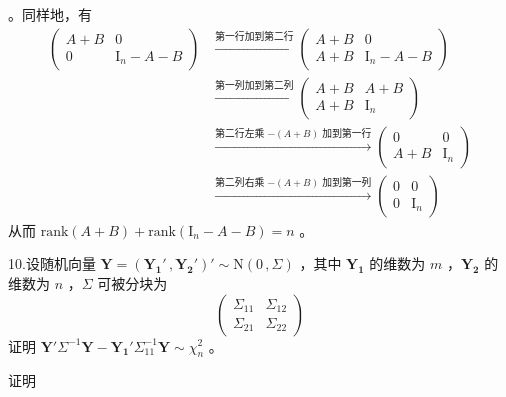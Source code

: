 \documentclass[12pt,hyperref,]{ctexart}
\begin{document}
。同样地，有 \begin{equation*}
\begin{aligned}
\begin{pmatrix}
A+B & 0 \\
0 & \mathrm{I}_n-A-B
\end{pmatrix} & \xrightarrow{\text{第一行加到第二行}} 
\begin{pmatrix}
A+B & 0 \\
A+B & \mathrm{I}_n-A-B
\end{pmatrix} \\
& \xrightarrow{\text{第一列加到第二列}}
\begin{pmatrix}
A+B & A+B \\
A+B & \mathrm{I}_n
\end{pmatrix} \\
& \xrightarrow{\text{第二行左乘 $-(A+B)$ 加到第一行}}
\begin{pmatrix}
0 & 0 \\
A+B & \mathrm{I}_n
\end{pmatrix} \\
& \xrightarrow{\text{第二列右乘 $-(A+B)$ 加到第一列}}
\begin{pmatrix}
0 & 0 \\
0 & \mathrm{I}_n
\end{pmatrix}
\end{aligned}
\end{equation*}从而
\(\mathrm{rank}(A+B)+\mathrm{rank}(\mathrm{I}_n-A-B)=n\) 。

\vspace{3em}

\kaishu

10.设随机向量
\(\boldsymbol{Y}=(\boldsymbol{Y_1}'\, ,\boldsymbol{Y_2}')'\sim \mathrm{N}(0\, ,\Sigma)\)
，其中 \(\boldsymbol{Y_1}\) 的维数为 \(m\) ，\(\boldsymbol{Y_2}\)
的维数为 \(n\) ，\(\Sigma\) 可被分块为 \begin{equation*}
\begin{pmatrix}
\Sigma_{11} & \Sigma_{12} \\
\Sigma_{21} & \Sigma_{22}
\end{pmatrix}
\end{equation*}证明
\(\boldsymbol{Y}'\Sigma^{-1}\boldsymbol{Y}-\boldsymbol{Y_1}'\Sigma_{11}^{-1}\boldsymbol{Y}\sim \chi_{n}^2\)
。

\vspace{1em}

\heiti

证明

\songti
\end{document}
